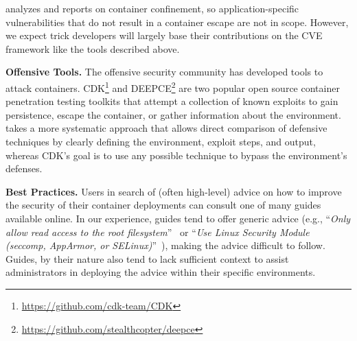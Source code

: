 \houdini analyzes and reports on container confinement, so application-specific vulnerabilities that do not result in a container escape are not in scope. However, we expect \houdini trick developers will largely base their contributions on the CVE framework like the tools described above.

\noindent\textbf{Offensive Tools.} The offensive security community has developed tools to attack containers. CDK\footnote{\url{https://github.com/cdk-team/CDK}} and DEEPCE\footnote{\url{https://github.com/stealthcopter/deepce}} are two popular open source container penetration testing toolkits that attempt a collection of known exploits to gain persistence, escape the container, or gather information about the environment. \houdini takes a more systematic approach that allows direct comparison of defensive techniques by clearly defining the environment, exploit steps, and output, whereas CDK's goal is to use any possible technique to bypass the environment's defenses.


\noindent\textbf{Best Practices.} Users in search of (often high-level) advice on how to improve the security of their container deployments can consult one of many guides~\cite{us_national_security_agency_kubernetes_2022,segura_dockerfile_2021,owasp_docker_nodate} available online. In our experience, guides tend to offer generic advice (e.g., ``\textit{Only allow read access to the root filesystem}''~\cite{segura_dockerfile_2021} or ``\textit{Use Linux Security Module (seccomp, AppArmor, or SELinux)}''~\cite{owasp_docker_nodate}), making the advice difficult to follow. Guides, by their nature also tend to lack sufficient context to assist administrators in deploying the advice within their specific environments.







